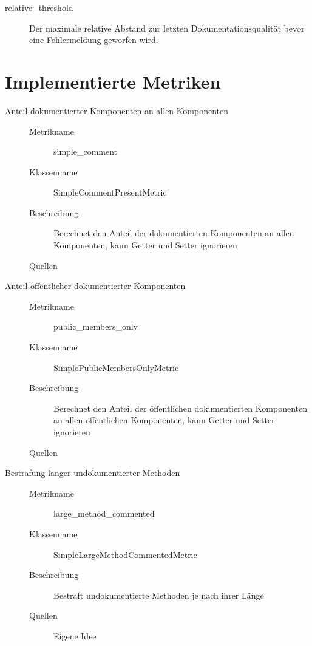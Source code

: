 \begin{appendices}
\begin{description}
         \item[relative\_threshold] Der maximale  relative Abstand zur letzten Dokumentationsqualität bevor eine Fehlermeldung geworfen wird.
        
        
        
    \label{enum:tool_javadoc_conf}
\end{description}
\chapter{Implementierte Metriken}\label{appendix_metrics}

\begin{description}

\item[Anteil dokumentierter Komponenten an allen Komponenten]
\begin{description}
\item[]
    \item [Metrikname]  simple\_comment
    \item [Klassenname] SimpleCommentPresentMetric
    \item[Beschreibung] Berechnet den Anteil der dokumentierten Komponenten an allen Komponenten, kann Getter und Setter ignorieren
    \item[Quellen] \cite[S. 5]{HowDocumentationEvolvesoverTime}
\end{description}

\item[Anteil öffentlicher dokumentierter Komponenten]
\begin{description}
\item[]
    \item [Metrikname]  public\_members\_only
    \item [Klassenname] SimplePublicMembersOnlyMetric
    \item[Beschreibung] Berechnet den Anteil der öffentlichen dokumentierten Komponenten an allen öffentlichen Komponenten, kann Getter und Setter ignorieren
     \item[Quellen] \cite[S. 253]{JavadocViolationsandTheirEvolutioninOpen-SourceSoftware}
\end{description}

\item[Bestrafung langer undokumentierter Methoden]
\begin{description}
\item[]
    \item [Metrikname]  large\_method\_commented
    \item [Klassenname] SimpleLargeMethodCommentedMetric
    \item[Beschreibung] Bestraft undokumentierte Methoden je nach ihrer Länge
    \item[Quellen] Eigene Idee
\end{description}


\end{description}
\end{appendices}
